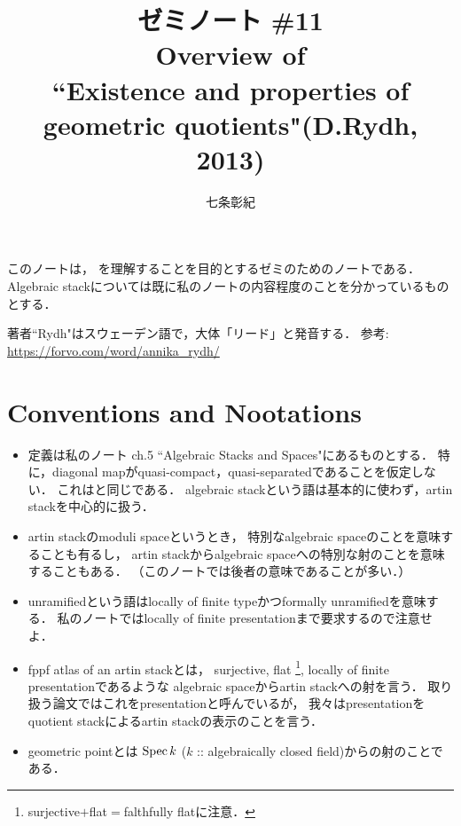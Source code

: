 \documentclass[a4paper, dvipdfmx]{jsarticle}
\begin{document}
\title{ゼミノート \#11 \\ Overview of \\ ``Existence and properties of geometric quotients"(D.Rydh, 2013)}
\author{七条彰紀}
\maketitle
\tableofcontents
\vspace{10pt}

このノートは，
\cite{Rydh13}を理解することを目的とするゼミのためのノートである．
Algebraic stackについては既に私のノート\cite{SAAlgSt}の内容程度のことを分かっているものとする．

\begin{Remark}
    著者``Rydh"はスウェーデン語で，大体「リード」と発音する．
    参考: \url{https://forvo.com/word/annika_rydh/}
\end{Remark}

\section*{Conventions and Nootations}
    \begin{itemize}[leftmargin=*]
    \item 
        定義は私のノート\cite{SAAlgSt} ch.5 ``Algebraic Stacks and Spaces"にあるものとする．
        特に，diagonal mapがquasi-compact，quasi-separatedであることを仮定しない．
        これは\cite{Rydh13}と同じである．
        algebraic stackという語は基本的に使わず，artin stackを中心的に扱う．

    \item
        artin stackのmoduli spaceというとき，
        特別なalgebraic spaceのことを意味することも有るし，
        artin stackからalgebraic spaceへの特別な射のことを意味することもある．
        （このノートでは後者の意味であることが多い．）

    \item
        unramifiedという語はlocally of finite typeかつformally unramifiedを意味する．
        私のノートではlocally of finite presentationまで要求するので注意せよ．

    \item
        fppf atlas of an artin stackとは，
        surjective, flat
            \footnote{ surjective$+$flat$=$falthfully flatに注意． },
        locally of finite presentationであるような
        algebraic spaceからartin stackへの射を言う．
        取り扱う論文\cite{Rydh13}ではこれをpresentationと呼んでいるが，
        我々はpresentationをquotient stackによるartin stackの表示のことを言う．

    \item
        geometric pointとは
        $\operatorname{Spec} k$ ($k$ :: algebraically closed field)からの射のことである．
    \end{itemize}
\end{document}
